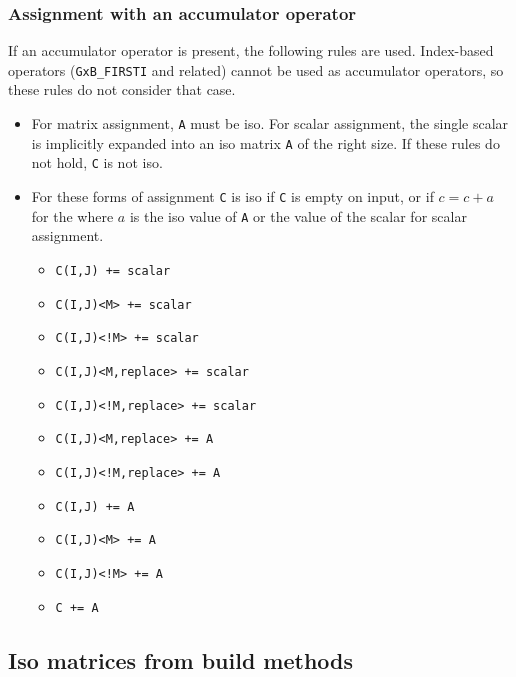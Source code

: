 \subsubsection{Assignment with an accumulator operator}

If an accumulator operator is present, the following rules are used.
Index-based operators (\verb'GxB_FIRSTI' and related) cannot be used as
accumulator operators, so these rules do not consider that case.

\begin{itemize}
\item
For matrix assignment, \verb'A' must be iso.  For scalar assignment, the single
scalar is implicitly expanded into an iso matrix \verb'A' of the right size.
If these rules do not hold, \verb'C' is not iso.

\item For these forms of assignment \verb'C' is iso if \verb'C' is
empty on input, or if $c=c+a$ for the where $a$ is the iso value of \verb'A' or
the value of the scalar for scalar assignment.

                \begin{itemize}
                \item \verb'C(I,J) += scalar'
                \item \verb'C(I,J)<M> += scalar'
                \item \verb'C(I,J)<!M> += scalar'
                \item \verb'C(I,J)<M,replace> += scalar'
                \item \verb'C(I,J)<!M,replace> += scalar'
                \item \verb'C(I,J)<M,replace> += A'
                \item \verb'C(I,J)<!M,replace> += A'
                \item \verb'C(I,J) += A'
                \item \verb'C(I,J)<M> += A'
                \item \verb'C(I,J)<!M> += A '
                \item \verb'C += A'
                \end{itemize}
\end{itemize}

\subsection{Iso matrices from build methods}
\label{iso_build}

